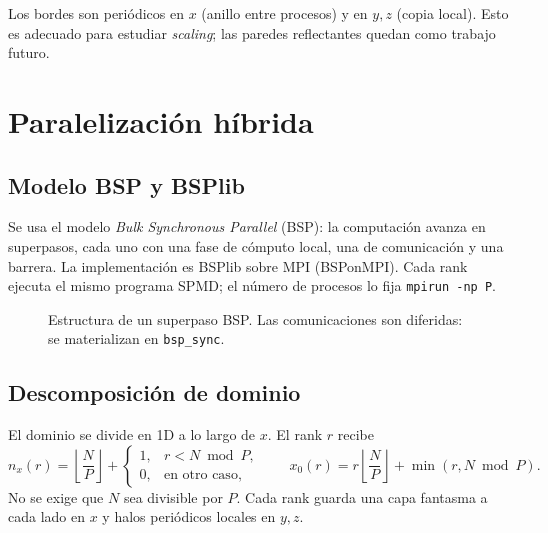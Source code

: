 \documentclass[11pt,a4paper]{article}
\begin{document}
Los bordes son periódicos en $x$ (anillo entre procesos) y en $y,z$ (copia
local). Esto es adecuado para estudiar \emph{scaling}; las paredes
reflectantes quedan como trabajo futuro.

\section{Paralelización híbrida}

\subsection{Modelo BSP y BSPlib}

Se usa el modelo \emph{Bulk Synchronous Parallel} (BSP): la computación avanza
en superpasos, cada uno con una fase de cómputo local, una de comunicación y
una barrera. La implementación es BSPlib sobre MPI (BSPonMPI). Cada rank
ejecuta el mismo programa SPMD; el número de procesos lo fija
\texttt{mpirun -np P}.

\begin{figure}[H]
\centering
{}
\caption{Estructura de un superpaso BSP. Las comunicaciones son diferidas:
se materializan en \texttt{bsp\_sync}.}
\label{fig:superstep}
\end{figure}

\subsection{Descomposición de dominio}

El dominio se divide en 1D a lo largo de $x$. El rank $r$ recibe
\begin{equation}
  n_x(r)=\left\lfloor\frac{N}{P}\right\rfloor
  +\begin{cases}1,& r<N\bmod P,\\0,&\text{en otro caso,}\end{cases}
  \qquad
  x_0(r)=r\left\lfloor\frac{N}{P}\right\rfloor+\min(r,N\bmod P).
\end{equation}
No se exige que $N$ sea divisible por $P$. Cada rank guarda una capa fantasma
a cada lado en $x$ y halos periódicos locales en $y,z$.
\end{document}
